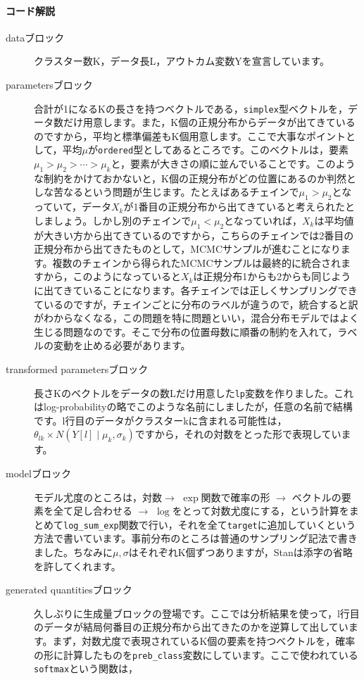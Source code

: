 \documentclass{ltjsbook}
\begin{document}
\paragraph{コード解説}
\begin{description}
    \item[dataブロック] クラスター数K，データ長L，アウトカム変数Yを宣言しています。
    \item[parametersブロック] 合計が1になるKの長さを持つベクトルである，\verb|simplex|型ベクトルを，データ数だけ用意します。また，K個の正規分布からデータが出てきているのですから，平均と標準偏差もK個用意します。ここで大事なポイントとして，平均$\mu$が\verb|ordered|型としてあるところです。このベクトルは，要素$\mu_1>\mu_2>\cdots>\mu_k$と，要素が大きさの順に並んでいることです。このような制約をかけておかないと，K個の正規分布がどの位置にあるのか判然としな苦なるという問題が生じます。たとえばあるチェインで$\mu_1>\mu_2$となっていて，データ$X_k$が1番目の正規分布から出てきていると考えられたとしましょう。しかし別のチェインで$\mu_1<\mu_2$となっていれば，$X_k$は平均値が大きい方から出てきているのですから，こちらのチェインでは2番目の正規分布から出てきたものとして，MCMCサンプルが進むことになります。複数のチェインから得られたMCMCサンプルは最終的に統合されますから，このようになっていると$X_k$は正規分布1からも2からも同じように出てきていることになります。各チェインでは正しくサンプリングできているのですが，チェインごとに分布のラベルが違うので，統合すると訳がわからなくなる，この問題を特に問題といい，混合分布モデルではよく生じる問題なのです。そこで分布の位置母数に順番の制約を入れて，ラベルの変動を止める必要があります。
    \item[transformed parametersブロック] 長さKのベクトルをデータの数Lだけ用意した\verb|lp|変数を作りました。これはlog-probabilityの略でこのような名前にしましたが，任意の名前で結構です。l行目のデータがクラスターkに含まれる可能性は，$\theta_{lk} \times N(Y[l]\mid\mu_k,\sigma_k)$ですから，それの対数をとった形で表現しています。
    \item[modelブロック] モデル尤度のところは，対数$\to$ $\exp$関数で確率の形 $\to$ ベクトルの要素を全て足し合わせる $\to$ $\log$をとって対数尤度にする，という計算をまとめて\verb|log_sum_exp|関数で行い，それを全て\verb|target|に追加していくという方法で書いています。事前分布のところは普通のサンプリング記法で書きました。ちなみに$\mu,\sigma$はそれぞれK個ずつありますが，Stanは添字の省略を許してくれます。
    \item[generated quantitiesブロック] 久しぶりに生成量ブロックの登場です。ここでは分析結果を使って，l行目のデータが結局何番目の正規分布から出てきたのかを逆算して出しています。まず，対数尤度で表現されているK個の要素を持つベクトルを，確率の形に計算したものを\verb|preb_class|変数にしています。ここで使われている\verb|softmax|という関数は，

\end{description}
\end{document}
